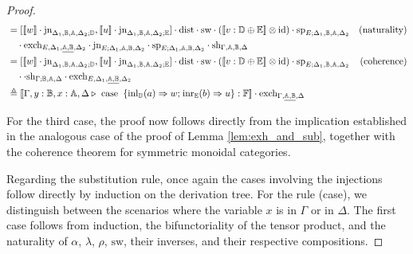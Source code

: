 \documentclass[10pt,a4paper]{amsart}
\theoremstyle{definition}
\theoremstyle{definition}
\theoremstyle{definition}
\theoremstyle{definition}
\theoremstyle{definition}
\theoremstyle{definition}
\begin{document}
\begin{proof}
\begin{align*}
  & = [[\![ w ]\!] \cdot \text{jn}_{\Delta_{1} ,\typeB,\typeA,  \Delta_{2};\typeD},  [\![u ]\!] \cdot \text{jn}_{\Delta_{1} ,\typeB,\typeA,  \Delta_{2};\typeE}] \cdot \text{dist} \cdot \text{sw} \cdot ([\![  v : \typeD \oplus \typeE  ]\!] \otimes \text{id}) \cdot \text{sp}_{E;\Delta_{1}, \typeB, \typeA, \Delta_{2}} & {\text{(naturality)}} \\
  & \hspace{10pt}  \cdot  \text{exch}_{E, \Delta_{1},\underline{\typeA,\typeB},  \Delta_{2}} \cdot  \text{jn}_{E ;\Delta_{1},\typeA,\typeB,  \Delta_{2}}   \cdot\text{sp}_{E; \Delta_{1},\typeA,\typeB,  \Delta_{2}} \cdot \text{sh}_{\Gamma,\typeA, \typeB,\Delta} \\
  & = [[\![ w ]\!] \cdot \text{jn}_{\Delta_{1} ,\typeB,\typeA,  \Delta_{2};\typeD},  [\![u ]\!] \cdot \text{jn}_{\Delta_{1} ,\typeB,\typeA,  \Delta_{2};\typeE}] \cdot \text{dist} \cdot \text{sw} \cdot ([\![  v : \typeD \oplus \typeE  ]\!] \otimes \text{id}) \cdot \text{sp}_{E; \Delta_{1}, \typeB,\typeA,  \Delta_{2}} & {\text{(coherence)}} \\
  & \hspace{10pt} \cdot \cdot \text{sh}_{\Gamma; \typeB,\typeA, \Delta} \cdot  \text{exch}_{E, \Delta_{1},\underline{\typeA,\typeB},  \Delta_{2}} \\
  & \triangleq [\![\Gamma,y:\typeB, x:\typeA, \Delta \vljud \text{ case }  \hspace{2pt}  \{\text{inl}_{\typeD} (a) \Rightarrow w ; \hspace{1pt} \text{inr}_{\typeE} (b) \Rightarrow u\}: \typeF]\!] \cdot \text{exch}_{\Gamma,\underline{\typeA,  \typeB}, \Delta}
\end{align*}

For the third case, the proof now follows directly from the implication established in the analogous case of the proof of Lemma \ref{lem:exh_and_sub}, together with the coherence theorem for symmetric monoidal categories.

Regarding the substitution rule, once again the cases involving the injections follow directly by induction on the derivation tree. For the rule (case), we distinguish between the scenarios where the variable $x$ is in $\Gamma$ or in $\Delta$. The first case follows from induction, the bifunctoriality of the tensor product, and the naturality of $\alpha$, $\lambda$, $\rho$, $\text{sw}$, their inverses, and their respective compositions.


\end{proof}
\end{document}
